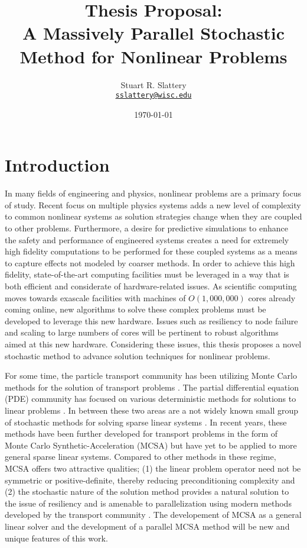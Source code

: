 \documentclass[letterpaper,12pt]{article}
\author{Stuart R. Slattery
\\ \href{mailto:sslattery@wisc.edu}{\texttt{sslattery@wisc.edu}}
}
\date{\today}
\title{Thesis Proposal:\\
  A Massively Parallel Stochastic Method for Nonlinear Problems}
\begin{document}
\maketitle

\section{Introduction}
In many fields of engineering and physics, nonlinear problems are a
primary focus of study. Recent focus on multiple physics systems adds
a new level of complexity to common nonlinear systems as solution
strategies change when they are coupled to other
problems. Furthermore, a desire for predictive simulations to enhance
the safety and performance of engineered systems creates a need for
extremely high fidelity computations to be performed for these coupled
systems as a means to capture effects not modeled by coarser
methods. In order to achieve this high fidelity, state-of-the-art
computing facilities must be leveraged in a way that is both efficient
and considerate of hardware-related issues. As scientific computing
moves towards exascale facilities with machines of $O(1,000,000)$
cores already coming online, new algorithms to solve these complex
problems must be developed to leverage this new hardware. Issues such
as resiliency to node failure and scaling to large numbers of cores
will be pertinent to robust algorithms aimed at this new
hardware. Considering these issues, this thesis proposes a novel
stochastic method to advance solution techniques for nonlinear
problems.

For some time, the particle transport community has been utilizing
Monte Carlo methods for the solution of transport problems
\cite{Lewis_1993}. The partial differential equation (PDE) community
has focused on various deterministic methods for solutions to linear
problems \cite{Saad_2003}. In between these two areas are a
not widely known small group of stochastic methods for solving sparse
linear systems \cite{Hammersley_1964, Halton_1962, Halton_1994,
  Evans_2003}. In recent years, these methods have been further
developed for transport problems in the form of Monte Carlo
Synthetic-Acceleration (MCSA) \cite{Evans_2009} but have yet to be
applied to more general sparse linear systems. Compared to other
methods in these regime, MCSA offers two attractive qualities; (1) the
linear problem operator need not be symmetric or positive-definite,
thereby reducing preconditioning complexity and (2) the stochastic
nature of the solution method provides a natural solution to the issue
of resiliency and is amenable to parallelization using modern methods
developed by the transport community \cite{Wagner_2011}. The
developement of MCSA as a general linear solver and the development of
a parallel MCSA method will be new and unique features of this work.
\end{document}
